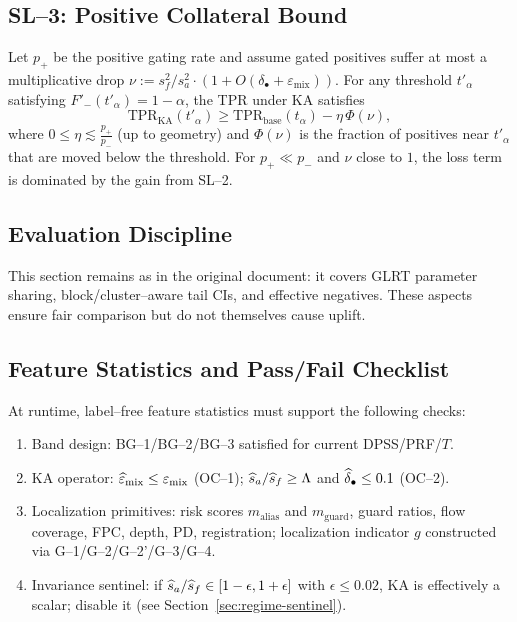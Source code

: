 \subsection{SL--3: Positive Collateral Bound}

Let $p_+$ be the positive gating rate and assume gated positives suffer at most a multiplicative drop $\nu := s_f^2/s_a^2\cdot(1+O(\delta_\bullet+\varepsilon_{\text{mix}}))$. For any threshold $t'_\alpha$ satisfying $F'_-(t'_\alpha)=1-\alpha$, the TPR under KA satisfies
\[
\mathrm{TPR}_{\text{KA}}(t'_\alpha) \ge \mathrm{TPR}_{\text{base}}(t_\alpha) - \eta\,\Phi(\nu),
\]
where $0\le \eta\lesssim \frac{p_+}{p_-}$ (up to geometry) and $\Phi(\nu)$ is the fraction of positives near $t'_\alpha$ that are moved below the threshold. For $p_+\ll p_-$ and $\nu$ close to $1$, the loss term is dominated by the gain from SL--2.

\subsection{Evaluation Discipline}
\label{app:ka-eval}

This section remains as in the original document: it covers GLRT parameter sharing, block/cluster--aware tail CIs, and effective negatives. These aspects ensure fair comparison but do not themselves cause uplift.

\subsection{Feature Statistics and Pass/Fail Checklist}
\label{sec:telemetry}

At runtime, label--free feature statistics must support the following checks:

\begin{enumerate}[label=(\roman*),nosep]
  \item Band design: BG--1/BG--2/BG--3 satisfied for current DPSS/PRF/$T$.
  \item KA operator: $\widehat\varepsilon_{\text{mix}}\le\varepsilon_{\text{mix}}$ (OC--1); $\widehat s_a/\widehat s_f\ge\Lambda$ and $\widehat\delta_\bullet\le 0.1$ (OC--2).
  \item Localization primitives: risk scores $m_{\text{alias}}$ and $m_{\text{guard}}$, guard ratios, flow coverage, FPC, depth, PD, registration; localization indicator $g$ constructed via G--1/G--2/G--2'/G--3/G--4.
  \item Invariance sentinel: if $\widehat s_a/\widehat s_f\in[1-\epsilon,1+\epsilon]$ with $\epsilon\le 0.02$, KA is effectively a scalar; disable it (see Section~\ref{sec:regime-sentinel}).
\end{enumerate}

